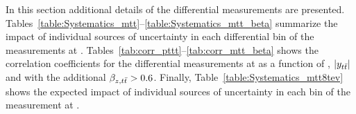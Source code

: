 In this section additional details of the differential measurements
are
presented. Tables~\ref{table:Systematics_mtt}--\ref{table:Systematics_mtt_beta}
summarize the impact of individual sources of uncertainty in each
differential bin of the measurements at
\seventev{}. Tables~\ref{tab:corr_pttt}--\ref{tab:corr_mtt_beta} shows
the correlation coefficients for the differential measurements at
\seventev{} as a function of \pttt{}, $|y_{t\bar{t}}{}|$ and \mtt{} with the
additional $\beta_{z,t\bar{t}}>0.6$. Finally, Table~\ref{table:Systematics_mtt8tev} shows
the expected impact of individual sources of uncertainty in each
\mtt{} bin of the measurement at \eighttev{}.


